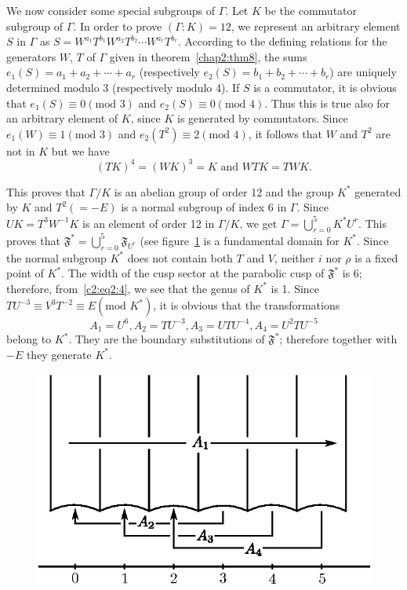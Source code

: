 We now consider some special subgroups of $\Gamma$. Let $K$ be the
commutator subgroup of $\Gamma$. In order to prove $(\Gamma:K)=12$, we
represent an arbitrary element $S$ in $\Gamma$ as $S=W^{a_1} T^{b_1}
W^{a_2} T^{b_2} \cdots W^{a_r} T^{b_r}$. According to the defining
relations for the generators $W$, $T$ of $\Gamma$ given in theorem~\ref{chap2:thm8},
the sums $e_1(S)=a_1+a_2+\cdots + a_r$ (respectively
$e_2(S)=b_1+b_2+\cdots + b_r$) are uniquely determined modulo 3
(respectively modulo 4). If $S$ is a commutator, it is obvious that
$e_1(S)\equiv 0(\text{mod } 3)$ and $e_2(S)\equiv 0(\text{mod } 4)$. Thus this is
true also for an arbitrary element of $K$, since $K$ is generated by
commutators. Since $e_1(W)\equiv 1(\text{mod } 3)$ and $e_2(T^2)\equiv 2(\text{mod }
4)$, it follows that $W$ and $T^2$ are not in $K$ but we have 
$$
(TK)^4 = (WK)^3 = K \text{ and } WTK = TWK.
$$

This proves that $\Gamma/K$ is an abelian group of order 12 and the
group $K^{\ast}$ generated by $K$ and $T^2(=-E)$ is a normal subgroup
of index 6 in $\Gamma$. Since $UK=T^3 W^{-1}K$ is an element of order
12 in $\Gamma/K$, we get $\Gamma=\bigcup\limits^5_{r=0}
K^{\ast}U^r$. This proves that $\mathfrak{F}^{\ast} =
\bigcup\limits^5_{r=0} \mathfrak{F}_{U^r}$ (see figure~\ref{chap2:fig13} is a
fundamental domain for $K^{\ast}$. Since the normal subgroup
$K^{\ast}$ does not contain both $T$ and $V$, neither $i$ nor $\rho$
is a fixed point of $K^{\ast}$. The width of the cusp sector at the
parabolic cusp of $\mathfrak{F}^{\ast}$ is 6; therefore, from~\eqref{c2:eq2:4},
we see that the genus of $K^{\ast}$ is 1. Since $T U^{-3} \equiv V^3
T^{-2}\equiv E(\text{mod } K^{\ast})$, it is obvious that the transformations
$$
A_1 = U^6, A_2 = TU^{-3}, A_3 = U T U^{-4}, A_4 = U^2 TU^{-5}
$$
belong to $K^{\ast}$. They are the boundary substitutions of
$\mathfrak{F}^{\ast}$; therefore together \pageoriginale with $-E$
they generate $K^{\ast}$.

\begin{figure}[H]
\centering
\includegraphics{vol29-fig/fig29-13.eps}
\smallskip
\caption{}
\label{chap2:fig13}
\end{figure}

